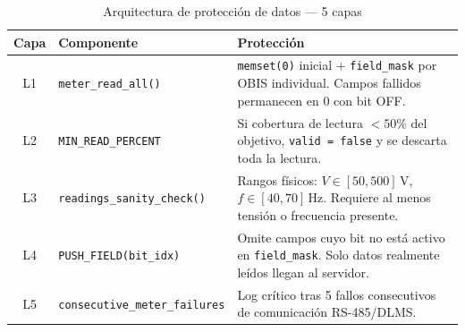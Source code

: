 \begin{table}[htbp]
\centering
\caption{Arquitectura de protección de datos --- 5 capas}
\label{tab:protection-layers}
\begin{tabular}{@{}clp{8cm}@{}}
\toprule
\textbf{Capa} & \textbf{Componente} & \textbf{Protección} \\
\midrule
L1 & \texttt{meter\_read\_all()} & \texttt{memset(0)} inicial + \texttt{field\_mask} por OBIS individual. Campos fallidos permanecen en 0 con bit OFF. \\
\addlinespace
L2 & \texttt{MIN\_READ\_PERCENT} & Si cobertura de lectura $<50\%$ del objetivo, \texttt{valid = false} y se descarta toda la lectura. \\
\addlinespace
L3 & \texttt{readings\_sanity\_check()} & Rangos físicos: $V \in [50, 500]$\,V, $f \in [40, 70]$\,Hz. Requiere al menos tensión o frecuencia presente. \\
\addlinespace
L4 & \texttt{PUSH\_FIELD(bit\_idx)} & Omite campos cuyo bit no está activo en \texttt{field\_mask}. Solo datos realmente leídos llegan al servidor. \\
\addlinespace
L5 & \texttt{consecutive\_meter\_failures} & Log crítico tras 5 fallos consecutivos de comunicación RS-485/DLMS. \\
\bottomrule
\end{tabular}
\end{table}
